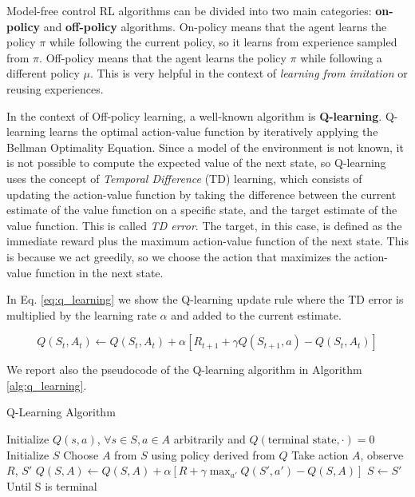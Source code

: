 Model-free control RL algorithms can be divided into two main categories: \textbf{on-policy} and \textbf{off-policy} algorithms.
On-policy means that the agent learns the policy $\pi$ while following the current policy, so it learns from experience sampled from $\pi$.
Off-policy means that the agent learns the policy $\pi$ while following a different policy $\mu$.
This is very helpful in the context of \textit{learning from imitation} or reusing experiences.

In the context of Off-policy learning, a well-known algorithm is \textbf{Q-learning}.
Q-learning learns the optimal action-value function by iteratively applying the Bellman Optimality Equation.
Since a model of the environment is not known, it is not possible to compute the expected value of the next state, so Q-learning uses the concept of \textit{Temporal Difference} (TD) learning, which consists of updating the action-value function by taking the difference between the current estimate of the value function on a specific state, and the target estimate of the value function.
This is called \textit{TD error}.
The target, in this case, is defined as the immediate reward plus the maximum action-value function of the next state.
This is because we act greedily, so we choose the action that maximizes the action-value function in the next state.

In Eq. \ref{eq:q_learning} we show the Q-learning update rule where the TD error is multiplied by the learning rate $\alpha$ and added to the current estimate.

\begin{equation} \label{eq:q_learning}
    Q(S_t, A_t) \leftarrow Q(S_t, A_t) + \alpha [R_{t+1} + \gamma Q(S_{t+1}, a) - Q(S_t, A_t)]
\end{equation}

We report also the pseudocode of the Q-learning algorithm in Algorithm \ref{alg:q_learning}.


\begin{algorithm}
\caption{Q-Learning Algorithm}\label{alg:q_learning}
\begin{algorithmic}
\State Initialize $Q(s, a)$,  $\forall s \in S, a \in A$ arbitrarily and $Q(\text{terminal state}, \cdot) = 0$
    \State Initialize $S$
        \State Choose $A$ from $S$ using policy derived from $Q$
        \State Take action $A$, observe $R$, $S'$
        \State $Q(S, A) \leftarrow Q(S, A) + \alpha [R + \gamma \max_{a'} Q(S', a') - Q(S, A)]$
        \State $S \leftarrow S'$
    \EndFor
\State Until S is terminal
\EndFor




\end{algorithmic}
\end{algorithm}



